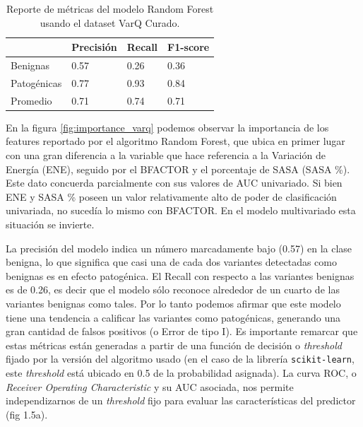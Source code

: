 \begin{table}[H]
\centering
\begin{tabular}{|l|l|l|l|}
\hline
              & Precisión & Recall & F1-score \\ \hline
Benignas      & 0.57      & 0.26   & 0.36     \\ \hline
Patogénicas   & 0.77      & 0.93   & 0.84     \\ \hline
Promedio      & 0.71      & 0.74   & 0.71     \\ \hline
\end{tabular}
\caption{Reporte de métricas del modelo Random Forest usando el dataset VarQ Curado.}
\label{tab:metrics_varq}
\end{table}


En la figura \ref{fig:importance_varq} podemos observar la importancia de los features reportado por el algoritmo Random Forest, que ubica en primer lugar con una gran diferencia a la variable que hace referencia a la Variación de Energía (ENE), seguido por el BFACTOR y el porcentaje de SASA (SASA \%). Este dato concuerda parcialmente con sus valores de AUC univariado. Si bien ENE y SASA \% poseen un valor relativamente alto de poder de clasificación univariada, no sucedía lo mismo con BFACTOR. En el modelo multivariado esta situación se invierte.

La precisión del modelo indica un número marcadamente bajo (0.57) en la clase benigna, lo que significa que casi una de cada dos variantes detectadas como benignas es en efecto patogénica. El Recall con respecto a las variantes benignas es de 0.26, es decir que el modelo sólo reconoce alrededor de un cuarto de las variantes benignas como tales. Por lo tanto podemos afirmar que este modelo tiene una tendencia a calificar las variantes como patogénicas, generando una gran cantidad de falsos positivos (o Error de tipo I). Es importante remarcar que estas métricas están generadas a partir de una función de decisión o \textit{threshold} fijado por la versión del algoritmo usado (en el caso de la librería \texttt{scikit-learn}, este \textit{threshold} está ubicado en 0.5 de la probabilidad asignada).  La curva ROC, o \textit{Receiver Operating Characteristic} y su AUC asociada, nos permite independizarnos de un \textit{threshold} fijo para evaluar las características del predictor (fig 1.5a).

\newpage

